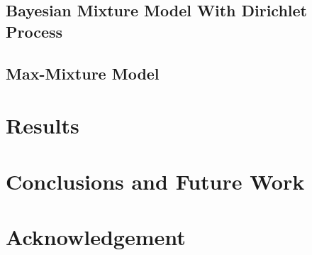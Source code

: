 \documentclass[ugly]{ion}
\begin{document}
	\subsection{Bayesian Mixture Model With Dirichlet Process}
	\subsection{Max-Mixture Model}

\section{Results}

 
\section{Conclusions and Future Work}



\section*{Acknowledgement}
\end{document}
